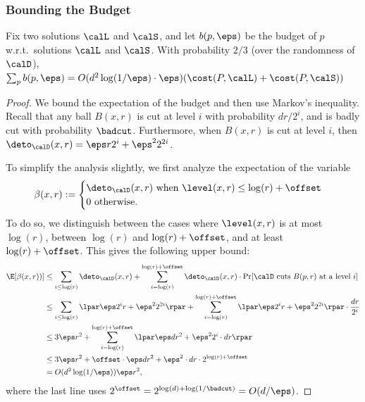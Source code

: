 \subsubsection{Bounding the Budget}
\begin{lemma}\label{lem:budgetBounded}
Fix two solutions $\calL$ and $\calS$, and let $b(p, \eps)$ be the budget of $p$ w.r.t.\ solutions $\calL$ and $\calS$. With probability  $2/3$ (over the randomness of $\calD$),   $\sum_p b(p, \eps) = O(d^2 \log(1/\eps) \cdot \eps) (\cost(P, \calL) + \cost(P, \calS))$
\end{lemma}
\begin{proof}
 We bound the expectation of the budget and then use Markov's inequality. Recall that any ball $B(x, r)$ is cut at level $i$ with probability $d r / 2^i$, and is  badly cut with probability $\badcut$. Furthermore, when $B(x, r)$  is cut at level $i$, then $\deto_\calD(x, r) = \eps r 2^i + \eps^2 2^{2i}$. 
 
 To simplify the analysis slightly, we first analyze the expectation of the variable 
\[\beta(x, r) := \begin{cases}\deto_\calD(x, r) \text{ when } \level(x, r) \leq \log(r) + \offset\\
 0 \text{ otherwise.}\end{cases}\]
 To do so, we distinguish between the cases where $\level(x, r)$ is at most $\log(r)$, between $\log(r)$ and $\log(r) + \offset$, and at least $\log(r) + \offset$. This gives the following upper bound:
 \begin{align*}
     \E[\beta(x, r))]
     &\leq \sum_{i \leq \log(r)} \deto_\calD(x, r) + \sum_{i = \log(r)}^{\log(r) + \offset} \deto_\calD(x, r) \cdot \Pr[\calD \text{ cuts } B(p,r) \text{ at a level } i]\\
     &\leq \sum_{i \leq \log(r)} \lpar \eps  2^i r + \eps^2 2^{2i} \rpar + \sum_{i = \log(r)}^{\log(r) + \offset} \lpar  \eps 2^i r + \eps^2 2^{2i}\rpar \cdot \frac{d r}{2^i}\\%
     &\leq 3\eps r^2 + \sum_{i = \log(r)}^{\log(r) + \offset} \lpar \eps d r^2 +  \eps^2 2^{i}  \cdot d r\rpar\\%
     &\leq 3\eps r^2 + \offset \cdot \eps d r^2 +  \eps^2  \cdot d r \cdot 2^{\log(r) + \offset}\\%
     &= O(d^2\log(1/\eps)) \eps r^2,
 \end{align*}
 where the last line uses $2^{\offset} = 2^{\log(d) + \log(1/\badcut)} = O(d/\eps)$.



\end{proof}
